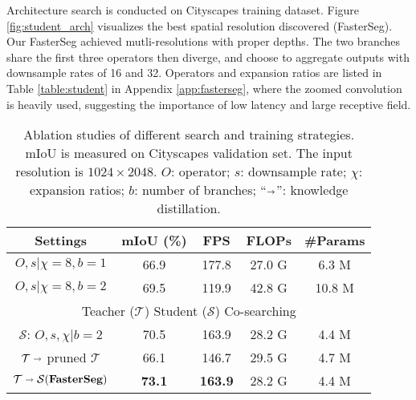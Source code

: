 \documentclass{article} \usepackage{iclr2020_conference,times}
\begin{document}
Architecture search is conducted on Cityscapes training dataset. Figure \ref{fig:student_arch} visualizes the best spatial resolution discovered (FasterSeg). Our FasterSeg achieved mutli-resolutions with proper depths. The two branches share the first three operators then diverge, and choose to aggregate outputs with downsample rates of 16 and 32. Operators and expansion ratios are listed in Table \ref{table:student} in Appendix \ref{app:fasterseg}, where the zoomed convolution is heavily used, suggesting the importance of low latency and large receptive field.\vspace{-0.5em}

\begin{wraptable}{r}{86mm}
\vspace{-1.5em}
\footnotesize
\begin{center}
\caption{Ablation studies of different search and training strategies. mIoU is measured on Cityscapes validation set. The input resolution is $1024\times2048$.
$O$: operator; $s$: downsample rate; $\chi$: expansion ratios; $b$: number of branches; ``$\shortrightarrow$'': knowledge distillation.
}
\begin{tabular}{ccccc}
\toprule
Settings & mIoU (\%) & FPS & FLOPs & \#Params\\ \midrule
$O, s | \chi=8, b=1$ & 66.9 & 177.8 & 27.0 G & 6.3 M \\
$O, s | \chi=8, b=2$ & 69.5 & 119.9 & 42.8 G & 10.8 M  \\
\midrule
\multicolumn{5}{c}{Teacher ($\mathcal{T}$) Student ($\mathcal{S}$) Co-searching} \\ \midrule
$\mathcal{S}$: $O, s, \chi | b=2$ & 70.5 & 163.9 & 28.2 G & 4.4 M  \\
$\mathcal{T} \shortrightarrow$ pruned $\mathcal{T}$ & 66.1 & 146.7 & 29.5 G & 4.7 M \\
$\mathcal{T} \shortrightarrow \mathcal{S} (\textbf{FasterSeg})$ & \textbf{73.1} & \textbf{163.9} & 28.2 G & 4.4 M \\ \bottomrule
\end{tabular}\label{table:ablation}
\end{center}
\vspace{-1em}
\end{wraptable}
\end{document}
